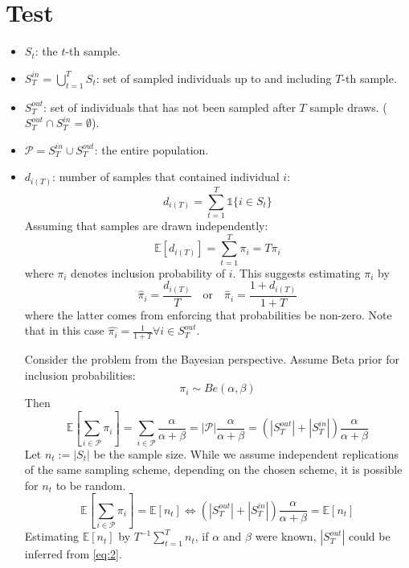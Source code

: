 \documentclass[a4paper, 12pt]{article}
\begin{document}
\section{Test}
\begin{itemize}
    \item $S_t$: the $t$-th sample.
    \item $S_T^{in} = \bigcup \limits_{t=1}^{T} S_t$: set of sampled individuals up to and including $T$-th sample.
    \item $S_T^{out}$: set of individuals that has not been sampled after $T$ sample draws. ($S_T^{out} \cap S_T^{in} = \emptyset$).
    \item $\mathcal{P} = S_T^{in} \cup S_T^{out}$: the entire population.
    \item $d_{i(T)}$: number of samples that contained individual $i$:
    \begin{equation*}
        d_{i(T)} = \sum_{t=1}^T \mathds{1}\{i \in S_t \}
    \end{equation*}
    Assuming that samples are drawn independently:
    \begin{equation*}
        \mathbb{E}[d_{i(T)}] = \sum_{t = 1}^T \pi_i = T\pi_i
    \end{equation*}
    where $\pi_i$ denotes inclusion probability of $i$. This suggests estimating $\pi_i$ by
    \begin{equation} \label{eq:1}
        \hat{\pi}_i = \frac{d_{i(T)}}{T} \quad \text{or} \quad \hat{\pi}_i = \frac{1 + d_{i(T)}}{1 + T}
    \end{equation}
    where the latter comes from enforcing that probabilities be non-zero. Note that in this case $\hat{\pi_i} = \frac{1}{1 + T} \forall i \in S_T^{out}$.
    
    Consider the problem from the Bayesian perspective. Assume Beta prior for inclusion probabilities:
    \begin{equation*}
        \pi_i \sim Be(\alpha, \beta)
    \end{equation*}
    Then
    \begin{equation*}
        \mathbb{E}[\sum_{i \in \mathcal{P}} \pi_i] = \sum_{i \in \mathcal{P}} \frac{\alpha}{\alpha + \beta} = |\mathcal{P}| \frac{\alpha}{\alpha + \beta} = (|S_T^{out}| + |S_T^{in}|) \frac{\alpha}{\alpha + \beta}
    \end{equation*}
    Let $n_t := |S_t|$ be the sample size. While we assume independent replications of the same sampling scheme, depending on the chosen scheme, it is possible for $n_t$ to be random.
    \begin{equation} \label{eq:2}
        \mathbb{E}[\sum_{i \in \mathcal{P}} \pi_i] = \mathbb{E}[n_t]
        \Leftrightarrow (|S_T^{out}| + |S_T^{in}|) \frac{\alpha}{\alpha + \beta} = \mathbb{E}[n_t]
    \end{equation}
    Estimating $\mathbb{E}[n_t]$ by $T^{-1} \sum_{t=1}^T n_t$, if $\alpha$ and $\beta$ were known, $|S_T^{out}|$ could be inferred from \eqref{eq:2}.
    

\end{itemize}
\end{document}
